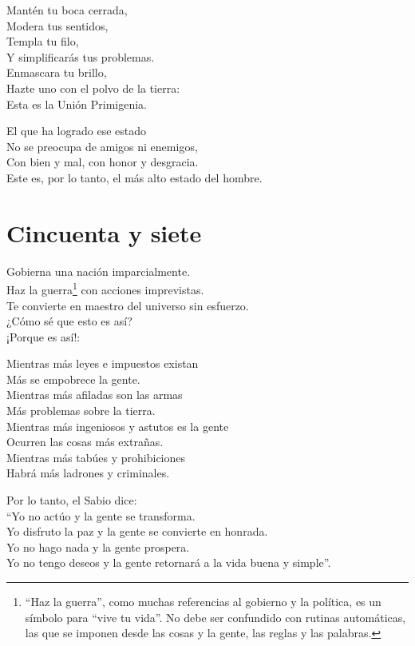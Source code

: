 \documentclass[hidelinks]{memoir}
\begin{document}
	Mantén tu boca cerrada,\\
	Modera tus sentidos,\\
	Templa tu filo,\\
	Y simplificarás tus problemas.\\
	Enmascara tu brillo,\\
	Hazte uno con el polvo de la tierra:\\
	Esta es la Unión Primigenia.
	
	El que ha logrado ese estado\\
	No se preocupa de amigos ni enemigos,\\
	Con bien y mal, con honor y desgracia.\\
	Este es, por lo tanto, el más alto estado del hombre.
	
	\chapter*{Cincuenta y siete}
	
	Gobierna una nación imparcialmente.\\
	Haz la guerra\footnote{``Haz la guerra'', como muchas referencias al gobierno y la política, es
		un símbolo para ``vive tu vida''. No debe ser confundido con rutinas
		automáticas, las que se imponen desde las cosas y la gente, las reglas y
		las palabras.} con acciones imprevistas.\\
	Te convierte en maestro del universo sin esfuerzo.\\
	¿Cómo sé que esto es así?\\
	¡Porque es así!:
	
	Mientras más leyes e impuestos existan\\
	Más se empobrece la gente.\\
	Mientras más afiladas son las armas\\
	Más problemas sobre la tierra.\\
	Mientras más ingeniosos y astutos es la gente\\
	Ocurren las cosas más extrañas.\\
	Mientras más tabúes y prohibiciones\\
	Habrá más ladrones y criminales.
	
	Por lo tanto, el Sabio dice:\\
	``Yo no actúo y la gente se transforma.\\
	Yo disfruto la paz y la gente se convierte en honrada.\\
	Yo no hago nada y la gente prospera.\\
	Yo no tengo deseos y la gente retornará a la vida buena y simple''.
	
\end{document}
